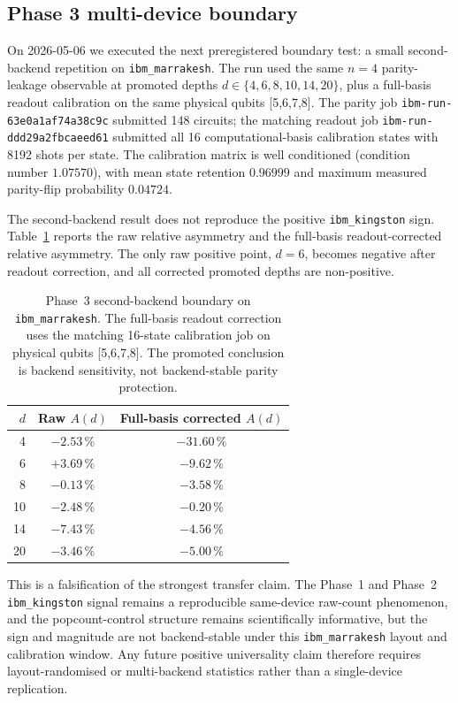 \documentclass[reprint,aps,physrev,superscriptaddress,floatfix,longbibliography]{revtex4-2}
\begin{document}
\subsection{Phase 3 multi-device boundary}
\label{sec:phase3}

On 2026-05-06 we executed the next preregistered boundary test: a
small second-backend repetition on \texttt{ibm\_marrakesh}. The run
used the same $n=4$ parity-leakage observable at promoted depths
$d\in\{4,6,8,10,14,20\}$, plus a full-basis readout calibration on
the same physical qubits [5,6,7,8]. The parity job
\texttt{ibm-run-63e0a1af74a38c9c} submitted 148 circuits; the matching
readout job \texttt{ibm-run-ddd29a2fbcaeed61} submitted all 16
computational-basis calibration states with 8192 shots per state. The
calibration matrix is well conditioned (condition number $1.07570$),
with mean state retention $0.96999$ and maximum measured parity-flip
probability $0.04724$.

The second-backend result does not reproduce the positive
\texttt{ibm\_kingston} sign. Table~\ref{tab:phase3} reports the raw
relative asymmetry and the full-basis readout-corrected relative
asymmetry. The only raw positive point, $d=6$, becomes negative after
readout correction, and all corrected promoted depths are
non-positive.

\begin{table}[tb]
\centering
\small
\begin{tabular}{rcc}
\toprule
$d$ & Raw $A(d)$ & Full-basis corrected $A(d)$ \\
\midrule
 4 & $-2.53\,\%$ & $-31.60\,\%$ \\
 6 & $+3.69\,\%$ & $-9.62\,\%$ \\
 8 & $-0.13\,\%$ & $-3.58\,\%$ \\
10 & $-2.48\,\%$ & $-0.20\,\%$ \\
14 & $-7.43\,\%$ & $-4.56\,\%$ \\
20 & $-3.46\,\%$ & $-5.00\,\%$ \\
\bottomrule
\end{tabular}
\caption{Phase~3 second-backend boundary on \texttt{ibm\_marrakesh}.
The full-basis readout correction uses the matching 16-state
calibration job on physical qubits [5,6,7,8]. The promoted conclusion
is backend sensitivity, not backend-stable parity protection.}
\label{tab:phase3}
\end{table}

This is a falsification of the strongest transfer claim. The Phase~1
and Phase~2 \texttt{ibm\_kingston} signal remains a reproducible
same-device raw-count phenomenon, and the popcount-control structure
remains scientifically informative, but the sign and magnitude are
not backend-stable under this \texttt{ibm\_marrakesh} layout and
calibration window. Any future positive universality claim therefore
requires layout-randomised or multi-backend statistics rather than a
single-device replication.
\end{document}

